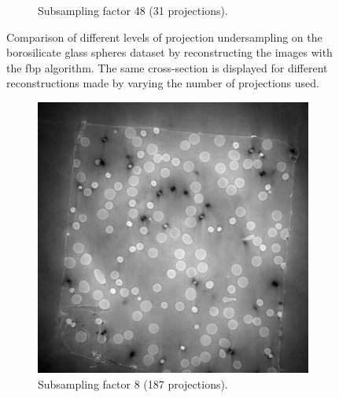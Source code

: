 \begin{figure}
\begin{subfigure}[t]{.45\textwidth}
    \caption{Subsampling factor 48 (31 projections). }
  \end{subfigure}
  \caption[Four different levels of projection undersampling]{Comparison of different levels of projection undersampling on the borosilicate glass spheres dataset by reconstructing the images with the \gls{fbp} algorithm. The same cross-section is displayed for different reconstructions made by varying the number of projections used.  }
  \label{fig:tomo00058missingwedgecomparison}
\end{figure}

\begin{figure}
  \begin{subfigure}[t]{.45\textwidth}
    \centering
    \includegraphics[width=\linewidth]{figures/ns8it100000itd4mse035logcosh3.png}
    \caption{Subsampling factor 8 (187 projections). }
  \end{subfigure}
  \hfill
  \begin{subfigure}[t]{.45\textwidth}
    \centering

\end{subfigure}
\end{figure}

